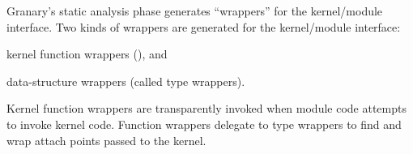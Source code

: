 \documentclass[preprint]{sigplanconf}
\begin{document}

Granary's static analysis phase generates ``wrappers'' for the kernel/module interface. Two kinds of wrappers are generated for the kernel/module interface: \begin{inparaenum}[i)]
	\item kernel function wrappers (), and
	\item data-structure wrappers (called type wrappers).
\end{inparaenum} Kernel function wrappers are transparently invoked when module code attempts to invoke kernel code. Function wrappers delegate to type wrappers to find and wrap attach points passed to the kernel. 

\end{document}

